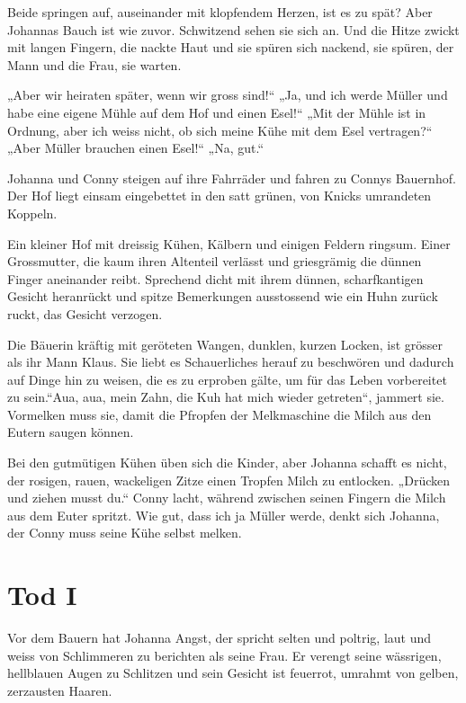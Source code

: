 \documentclass[10pt,a5paper]{book}
\begin{document}
Beide springen auf, auseinander mit klopfendem Herzen, ist es zu spät? Aber Johannas Bauch ist wie zuvor. Schwitzend sehen sie sich an. Und die Hitze zwickt mit langen Fingern, die nackte Haut und sie spüren sich nackend, sie spüren, der Mann und die Frau, sie warten.

„Aber wir heiraten später, wenn wir gross sind!“ „Ja, und ich werde Müller und habe eine eigene Mühle auf dem Hof und einen Esel!“ „Mit der Mühle ist in Ordnung, aber ich weiss nicht, ob sich meine Kühe mit dem Esel vertragen?“ „Aber Müller brauchen einen Esel!“ „Na, gut.“

Johanna und Conny steigen auf ihre Fahrräder und fahren zu Connys Bauernhof. Der Hof liegt einsam eingebettet in den satt grünen, von Knicks umrandeten Koppeln.

Ein kleiner Hof mit dreissig Kühen, Kälbern und einigen Feldern ringsum. Einer Grossmutter, die kaum ihren Altenteil verlässt und griesgrämig die dünnen Finger aneinander  reibt. Sprechend dicht mit ihrem dünnen, scharfkantigen Gesicht heranrückt und spitze Bemerkungen ausstossend wie ein Huhn zurück ruckt, das Gesicht verzogen.

Die Bäuerin kräftig mit geröteten Wangen, dunklen, kurzen Locken, ist grösser als ihr Mann Klaus. Sie liebt es Schauerliches herauf zu beschwören und dadurch auf Dinge hin zu weisen, die es zu erproben gälte, um für das Leben vorbereitet zu sein.“Aua, aua, mein Zahn, die Kuh hat mich wieder getreten“, jammert sie. Vormelken muss sie, damit die Pfropfen der Melkmaschine die Milch aus den Eutern saugen können.

Bei den gutmütigen Kühen üben sich die Kinder, aber Johanna schafft es nicht, der rosigen, rauen, wackeligen Zitze einen Tropfen Milch zu entlocken. „Drücken und ziehen musst du.“ Conny lacht, während zwischen seinen Fingern die Milch aus dem Euter spritzt. Wie gut, dass ich ja Müller werde, denkt sich Johanna, der Conny muss seine Kühe selbst melken.


\section*{Tod I}


Vor dem Bauern hat Johanna Angst, der spricht selten und poltrig, laut und weiss von Schlimmeren zu berichten als seine Frau. Er verengt seine wässrigen, hellblauen Augen zu Schlitzen und sein Gesicht ist feuerrot, umrahmt von gelben, zerzausten Haaren.
\end{document}
